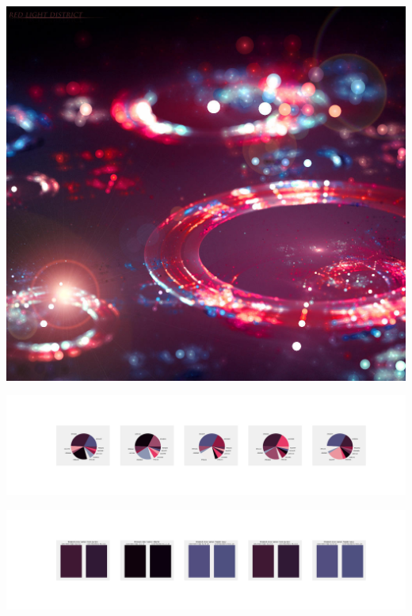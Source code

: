 \documentclass[11pt]{article}
\begin{document}
\begin{landscape}
    \begin{center}
    \includegraphics[width=\textwidth]{./nbimg/file (92).jpg}
    \end{center}

    \begin{center}
    \includegraphics[width=250mm]{./nbimg/pie-443.jpg}
    \end{center}

    \begin{center}
    \includegraphics[width=250mm]{./nbimg/peak-443.jpg}
    \end{center}
    


\end{landscape}
\end{document}
